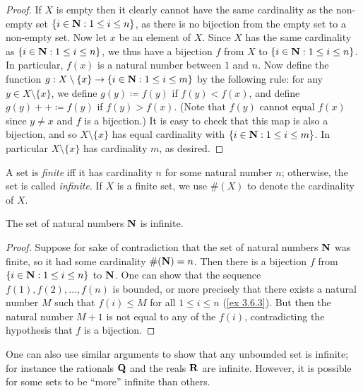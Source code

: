 \begin{proof}
  If \(X\) is empty then it clearly cannot have the same cardinality as the non-empty set \(\{i \in \mathbf{N} : 1 \leq i \leq n\}\), as there is no bijection from the empty set to a non-empty set.
  Now let \(x\) be an element of \(X\).
  Since \(X\) has the same cardinality as \(\{i \in \mathbf{N} : 1 \leq i \leq n\}\), we thus have a bijection \(f\) from \(X\) to \(\{i \in \mathbf{N} : 1 \leq i \leq n\}\).
  In particular, \(f(x)\) is a natural number between \(1\) and \(n\).
  Now define the function \(g : X \setminus \{x\} \to \{i \in \mathbf{N} : 1 \leq i \leq m\}\) by the following rule: for any \(y \in X \setminus \{x\}\), we define \(g(y) \coloneqq f(y)\) if \(f(y) < f(x)\), and define \(g(y)++ \coloneqq f(y)\) if \(f(y) > f(x)\).
  (Note that \(f(y)\) cannot equal \(f(x)\) since \(y \neq x\) and \(f\) is a bijection.)
  It is easy to check that this map is also a bijection, and so \(X \setminus \{x\}\) has equal cardinality with \(\{i \in \mathbf{N} : 1 \leq i \leq m\}\).
  In particular \(X \setminus \{x\}\) has cardinality \(m\), as desired.
\end{proof}

\begin{definition}\label{3.6.10}
  A set is \emph{finite} iff it has cardinality \(n\) for some natural number \(n\);
  otherwise, the set is called \emph{infinite}.
  If \(X\) is a finite set, we use \(\#(X)\) to denote the cardinality of \(X\).
\end{definition}

\setcounter{theorem}{11}
\begin{theorem}\label{3.6.12}
  The set of natural numbers \(\mathbf{N}\) is infinite.
\end{theorem}

\begin{proof}
  Suppose for sake of contradiction that the set of natural numbers \(\mathbf{N}\) was finite, so it had some cardinality \(\#(\mathbf{N}) = n\).
  Then there is a bijection \(f\) from \(\{i \in \mathbf{N} : 1 \leq i \leq n\}\) to \(\mathbf{N}\).
  One can show that the sequence \(f(1), f(2), \dots, f(n)\) is bounded, or more precisely that there exists a natural number \(M\) such that \(f(i) \leq M\) for all \(1 \leq i \leq n\) (\cref{ex 3.6.3}).
  But then the natural number \(M+1\) is not equal to any of the \(f(i)\), contradicting the hypothesis that \(f\) is a bijection.
\end{proof}

\begin{remark}\label{3.6.13}
  One can also use similar arguments to show that any unbounded set is infinite;
  for instance the rationals \(\mathbf{Q}\) and the reals \(\mathbf{R}\) are infinite.
  However, it is possible for some sets to be ``more'' infinite than others.
\end{remark}

